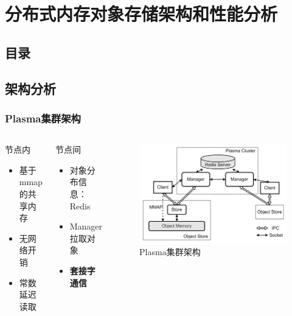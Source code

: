 \section{分布式内存对象存储架构和性能分析}

\subsection*{目录}

\subsection*{架构分析}
\begin{frame}
	\frametitle{Plasma集群架构}

	\vspace{-1.5em}
	\begin{columns}[t]
		\begin{block}{节点内}
			\begin{itemize}
				\item 基于mmap的共享内存
				\item 无网络开销
				\item 常数延迟读取
			\end{itemize}
		\end{block}
		\begin{block}{节点间}
			\begin{itemize}
				\item 对象分布信息：Redis
				\item Manager拉取对象
				\item \textbf{套接字通信}
			\end{itemize}
		\end{block}
		\begin{figure}
			\centering
			\includegraphics[width=\textwidth]{image/chap02/plasma_arch.png}
			\caption{Plasma集群架构}
		\end{figure}
	\end{columns}

\end{frame}

